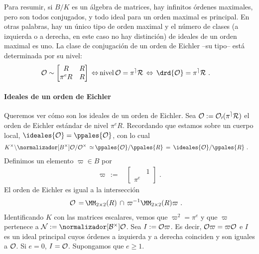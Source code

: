Para resumir, si $B/K$ es un \'{a}lgebra de matrices, hay infinitos
\'{o}rdenes maximales, pero son todos conjugados, y todo ideal para
un orden maximal es principal. En otras palabras, hay un \'{u}nico tipo
de orden maximal y el n\'{u}mero de clases (a izquierda o a derecha,
en este caso no hay distinci\'{o}n) de ideales de un orden maximal es uno.
La clase de conjugaci\'{o}n de un orden de Eichler --su tipo-- est\'{a}
determinada por su nivel:
\begin{align*}
 \cal{O}\sim\begin{bmatrix} R & R \\ \pi^{e}R & R \end{bmatrix}
	\,\Leftrightarrow\, &
 \text{nivel}\,\cal{O}=\pi^{e}R\,\Leftrightarrow\,
	\drd{\cal{O}}=\pi^{e}R
	\text{ .}
\end{align*}
%

\paragraph{Ideales de un orden de Eichler}
Queremos ver c\'{o}mo son los ideales de un orden de Eichler. Sea
$\cal{O}:=\cal{O}_{0}(\pi^{e}R)$ el orden de Eichler est\'{a}ndar de nivel
$\pi^{e}R$.
Recordando que estamos sobre un cuerpo local,
$\ideales{\cal{O}}=\ppales{\cal{O}}$, con lo cual
\begin{align*}
 K^{\times}\backslash\normalizador[B^{\times}]{\cal{O}}/\cal{O}^{\times}
	\,\simeq\, & \ppales{\cal{O}}/\ppales{R}
	\,=\, \ideales{\cal{O}}/\ppales{R}
	\text{ .}
\end{align*}
%
Definimos un elemento $\varpi\in B$ por
\begin{align*}
	\varpi\,:=\, & \begin{bmatrix} & 1 \\ \pi^{e} & \end{bmatrix}
		\text{ .}
\end{align*}
%
El orden de Eichler es igual a la intersecci\'{o}n
\begin{align*}
 \cal{O} \,=\, & \MM_{2\times 2}(R)\,\cap\,
	\varpi^{-1}\MM_{2\times 2}(R)\varpi
	\text{ .}
\end{align*}
%
Identificando $K$ con las matrices escalares, vemos que $\varpi^{2}=\pi^{e}$
y que $\varpi$ pertenece a $\cal{N}:=\normalizador[B^{\times}]{\cal{O}}$.
Sea $I:=\cal{O}\varpi$. Es decir, $\cal{O}\varpi=\varpi\cal{O}$ e $I$ es un
ideal principal cuyos \'{o}rdenes a izquierda y a derecha coinciden y son
iguales a $\cal{O}$. Si $e=0$, $I=\cal{O}$. Supongamos que $e\geq 1$.

